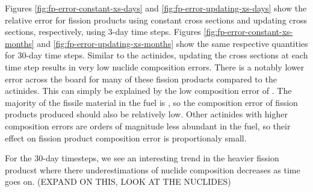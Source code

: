     Figures \ref{fig:fp-error-constant-xs-days} and
    \ref{fig:fp-error-updating-xs-days} show the relative error for fission
    products using constant cross sections and updating cross sections,
    respectively, using 3-day time steps. Figures
    \ref{fig:fp-error-constant-xs-months} and
    \ref{fig:fp-error-updating-xs-months} show the same respective quantities
    for 30-day time steps. Similar to the actinides, updating the cross sections
    at each time step results in very low nuclide composition errors. There is a
    notably lower error across the board for many of these fission products
    compared to the actinides. This can simply be explained by the low
    composition error of . The majority of the fissile material in
    the fuel is , so the composition error of fission products
    produced should also be relatively low. Other actinides with higher
    composition errors are orders of magnitude less abundant in the fuel, so
    their effect on fission product composition error is proportionaly small.

    For the 30-day timesteps, we see an interesting trend in the heavier fission
    producst where there underestimations of nuclide composition decreases as
    time goes on. (EXPAND ON THIS, LOOK AT THE NUCLIDES)

